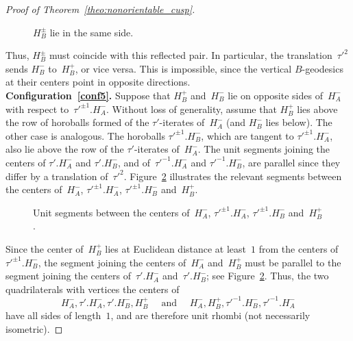 \documentclass[11pt,reqno]{amsart}
\theoremstyle{definition}
\numberwithin{equation}{section}
\numberwithin{equation}{section}
\begin{document}
\begin{proof}[Proof of Theorem~\ref{theo:nonorientable_cusp}]
\medskip

\begin{figure}[htbp!]
\centering
\vspace*{3.3cm}
\hspace*{-0.5cm}
\def\svgwidth{0.35\textheight}

\vspace*{0.3cm}
\caption{$H_B^{\pm}$ lie in the same side.} \label{fig:000}
\end{figure}


Thus, $H_B^{\pm}$ must coincide with this reflected pair.
In particular, the translation~$\tau'^2$ sends $H_B^-$ to~$H_B^+$, or vice versa.
This is impossible, since the vertical $B$-geodesics at their centers point in opposite directions. \\

\textbf{Configuration~\eqref{conf5}.}
Suppose that $H_B^+$ and~$H_B^-$ lie on opposite sides of~$H_A^-$ with respect to~$\tau'^{\pm 1}.H_A^-$.
Without loss of generality, assume that $H_B^+$ lies above the row of horoballs formed of the $\tau'$-iterates of~$H_A^-$ (and $H_B^-$ lies below).
The other case is analogous.
The horoballs $\tau'^{\pm 1}.H_B^-$, which are tangent to $\tau'^{\pm 1}.H_A^-$, also lie above the row of the $\tau'$-iterates of~$H_A^-$.
The unit segments joining the centers of $\tau'.H_A^-$ and $\tau'.H_B^-$, and of~$\tau'^{-1}.H_A^-$ and $\tau'^{-1}.H_B^-$, are parallel since they differ by a translation of~$\tau'^2$.
Figure~\ref{fig:888} illustrates the relevant segments between the centers of~$H_A^-$, $\tau'^{\pm 1}.H_A^-$, $\tau'^{\pm 1}.H_B^-$ and~$H_B^+$.


\medskip

\begin{figure}[htbp!]
\centering
\vspace*{1,9cm}
\hspace*{-0.5cm}
\def\svgwidth{0.25\textheight}

\vspace*{0.3cm}
\caption{Unit segments between the centers of~$H_A^-$, $\tau'^{\pm 1}.H_A^-$, $\tau'^{\pm 1}.H_B^-$ and~$H_B^+$.} \label{fig:888}
\end{figure}

Since the center of~$H_B^+$ lies at Euclidean distance at least~$1$ from the centers of $\tau'^{\pm 1}.H_B^-$, the segment joining the centers of~$H_A^-$ and~$H_B^+$ must be parallel to the segment joining the centers of~$\tau'.H_A^-$ and~$\tau'.H_B^-$; see Figure~\ref{fig:888}.
Thus, the two quadrilaterals with vertices the centers of
\[
H_A^-, \tau'.H_A^-, \tau'.H_B^-, H_B^+ \quad \mbox{ and } \quad H_A^-, H_B^+, \tau'^{-1}.H_B^-, \tau'^{-1}.H_A^-
\] 
have all sides of length~$1$, and are therefore unit rhombi (not necessarily isometric).


\end{proof}
\end{document}
